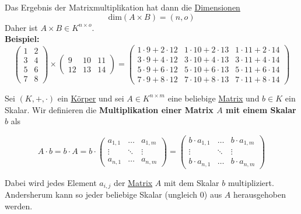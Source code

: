 \documentclass[../../main.tex]{subfiles}
\begin{document}
\begin{definition}[Matrixmultiplikation]
		Das Ergebnis der Matrixmultiplikation hat dann die \hyperref[def:DimensionMatrix]{Dimensionen} $$\textrm{dim}(A \times B) = (n,o)$$
		Daher ist $A \times B \in K^{n \times o}$. \\
		
	
		\textbf{Beispiel:}		
		$$
		\begin{pmatrix} 1 & 2 \\ 3 & 4 \\ 5 & 6 \\ 7 & 8\end{pmatrix} 
		\times 
		\begin{pmatrix} 9 & 10 & 11 \\ 12 & 13 & 14\end{pmatrix}
		=
		\begin{pmatrix} 
		1 \cdot 9 + 2 \cdot 12 & 1 \cdot 10 + 2 \cdot 13  & 1 \cdot 11 + 2 \cdot 14 \\ 
		3 \cdot 9 + 4 \cdot 12 & 3 \cdot 10 + 4 \cdot 13  & 3 \cdot 11 + 4 \cdot 14 \\
		5 \cdot 9 + 6 \cdot 12 & 5 \cdot 10 + 6 \cdot 13  & 5 \cdot 11 + 6 \cdot 14 \\
		7 \cdot 9 + 8 \cdot 12 & 7 \cdot 10 + 8 \cdot 13  & 7 \cdot 11 + 8 \cdot 14
		\end{pmatrix}
		$$
		
	\end{definition}
	
	\begin{definition}
		Sei $(K,+,\cdot)$ ein \hyperref[def:Körper]{Körper} und sei $A\in K^{n \times m}$ eine beliebige \hyperref[def:Matrix]{Matrix} und $b \in K$ ein Skalar. Wir definieren die \textbf{Multiplikation einer Matrix $A$ mit einem Skalar $b$} als 
		
		$$A \cdot b = b \cdot A = b \cdot \begin{pmatrix} a_{1,1} & \dots & a_{1,m} \\ \vdots & \ddots & \vdots \\ a_{n,1} & \dots & a_{n,m} \end{pmatrix} = \begin{pmatrix} b \cdot a_{1,1} & \dots & b \cdot a_{1,m} \\ \vdots & \ddots & \vdots \\ b \cdot a_{n,1} & \dots & b \cdot a_{n,m} \end{pmatrix}$$
		
		Dabei wird jedes Element $a_{i,j}$ der \hyperref[def:Matrix]{Matrix} $A$ mit dem Skalar $b$ multipliziert. Andersherum kann so jeder beliebige Skalar (ungleich 0) aus $A$ herausgehoben werden. 
	\end{definition}
\end{document}
